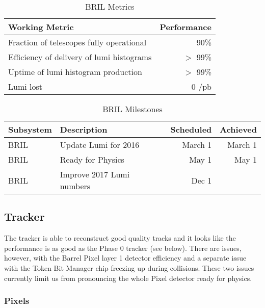 \begin{table}[htp]
\caption{BRIL Metrics}
\begin{center}
\begin{tabular}{|l|r|}
\hline
Working Metric&Performance\\
\hline
Fraction of telescopes fully operational &  90\% \\
\hline
Efficiency of delivery of lumi histograms &  $>$ 99\% \\
\hline
Uptime of lumi  histogram production & $>$ 99\% \\
\hline
Lumi lost & 0 /pb \\
\hline
\end{tabular}
\end{center}
\label{BRILMetrics}
\end{table}%


\begin{table}[htp]
\caption{BRIL Milestones}
\begin{center}
\begin{tabular}{|l|l|r|r|}
\hline
Subsystem&Description&Scheduled&Achieved\\
\hline
BRIL & Update Lumi for 2016
& March 1& March 1\\
\hline
BRIL& Ready for Physics & May 1& May 1   \\
\hline
BRIL & Improve 2017 Lumi numbers & Dec 1 &  \\
\hline
\end{tabular}
\end{center}
\label{BRILMIlestones}
\end{table}%



\subsection{Tracker }

The tracker is able to reconstruct good quality tracks and it looks like the performance is as good as the Phase 0 tracker (see below). There are issues,  however, with the Barrel Pixel layer 1 detector efficiency and a separate issue with the Token Bit Manager chip freezing up during collisions. These two issues currently limit us from pronouncing the whole Pixel detector ready for physics.

\subsubsection{Pixels }

